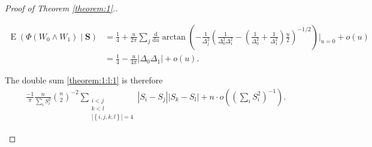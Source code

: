 \documentclass[12pt]{article}
\newcommand{\s}{S}
\newcommand{\w}{W}
\renewcommand{\vec}[1]{\textbf{#1}}
\DeclareMathOperator{\E}{E}
\newcommand{\comment}[1]{
  \iftoggle{commenttoggle}{
    {\normalsize{\color{red}{ #1}}\normalsize}
  }
  {}
}
\begin{document}
\begin{proof}[Proof of Theorem \ref{theorem:1}.]
\begin{enumerate}[wide, labelwidth=!, labelindent=0pt]
    \begin{align}
      \E\left(\Phi(\w_0\wedge \w_1)\mid \vec{\s}\right) &=\frac{1}{4} + \frac{u}{2\pi}\sum_j\frac{\mathrm{d}}{\mathrm{d} u}\arctan\left(-\frac{1}{\Delta_j^2}\left(\frac{1}{\Delta_0^2\Delta_1^2}-\left(\frac{1}{\Delta_0^2}+\frac{1}{\Delta_1^2}\right)\frac{u}{2}\right)^{-1/2}\right)\bigg|_{u=0} + o(u)\\
      &=\frac{1}{4}-\frac{u}{4\pi}|\Delta_0\Delta_1| + o(u).
    \end{align}
    
    The double sum \eqref{theorem:1:l:1} is therefore
    \begin{align}
\frac{-1}{\pi}\frac{n}{\sum_i\s_i^2}{n\choose2}^{-2}\sum_{\substack{i<j\\k<l\\|\left\{i,j,k,l\right\}|=4}}
      |\s_i-\s_j||\s_k-\s_l| + n\cdot o\left(\left(\sum_i\s_i^2\right)^{-1}\right).\label{theorem:1:step:2:l:1}
    \end{align}


\end{enumerate}
\end{proof}
\end{document}
